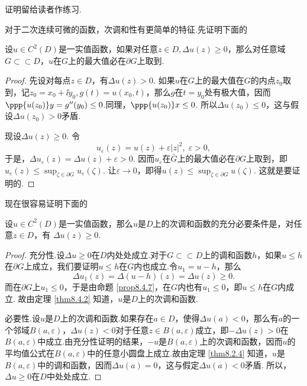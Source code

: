 证明留给读者作练习.

对于二次连续可微的函数，次调和性有更简单的特征.先证明下面的
\begin{prop}\label{prop8.4.7}
设$u\in C^2(D)$是一实值函数，如果对任意$z\in D,\Delta u(z)\ge0$，那么对任意域$G\subset\subset D$，$u$在$G$上的最大值必在$\partial G$上取到.
\end{prop}
\begin{proof}
先设对每点$z\in D$，有$\Delta u(z)>0$. 如果$u$在$G$上的最大值在$G$的内点$z_0$取到，记$z_0=x_0+\ii y_0,g(t)=u(x_0,t)$，那么$g$在$t=y_0$处有极大值，因而$\ppp{u(z_0)}y
=g''(y_0)\le0$.同理，$\ppp{u(z_0)}x\le0$. 所以$\Delta u(z_0)\le0$，这与假设$\Delta u(z_0)>0$矛盾.

现设$\Delta u(z)\ge0$. 令
\[u_\varepsilon(z)=u(z)+\varepsilon|z|^2,\;\varepsilon>0,\]
于是，$\Delta u_\varepsilon(z)=\Delta u(z)+\varepsilon>0$. 因而$u_\varepsilon$在$\bar G$上的最大值必在$\partial G$上取到，即$u_\varepsilon(z)\le\sup_{\zeta\in\partial G}u_\varepsilon(\zeta)$. 让$\varepsilon\to0$，即得$u(z)\le\sup_{\zeta\in\partial G}u(\zeta)$. 这就是要证明的.
\end{proof}

现在很容易证明下面的
\begin{theorem}\label{eq8.4.8}
设$u\in C^2(D)$是一实值函数，那么$u$是$D$上的次调和函数的充分必要条件是，对任意$z\in D$，有
$\Delta u(z)\ge0$.
\end{theorem}
\begin{proof}
充分性.设$\Delta u\ge0$在$D$内处处成立.对于$G\subset\subset D$上的调和函数$h$，如果$u\le h$在$\partial G$上成立，我们要证明$u\le h$在$G$内也成立.令$u_1=u-h$，那么
\[\Delta u_1(z)=\Delta(u-h)(z)=\Delta u(z)\ge0.\]
而在$\partial G$上$u_1\le0$，于是由命题 \ref{prop8.4.7}，在$G$内也有$u_1\le0$，即$u\le h$在$G$内成立. 故由定理 \ref{thm8.4.2} 知道，$u$是$D$上的次调和函数.

必要性.设$u$是$D$上的次调和函数.如果存在$a\in D$，使得$\Delta u(a)<0$，那么有$a$的一个邻域$B(a,\varepsilon)$，$\Delta u(z)<0$对于任意$z\in B(a,\varepsilon)$成立，即$-\Delta u(z)>0$在$B(a,\varepsilon)$中成立.由充分性证明的结果，$-u$是$B(a,\varepsilon)$上的次调和函数，因而$u$的平均值公式在$B(a,\varepsilon)$中的任意小圆盘上成立.故由定理 \ref{thm8.2.4} 知道，$u$是$B(a,\varepsilon)$中的调和函数，因而$\Delta u(a)=0$，这与假定$\Delta u(a)<0$矛盾.
所以，$\Delta u\ge0$在$D$中处处成立.
\end{proof}

